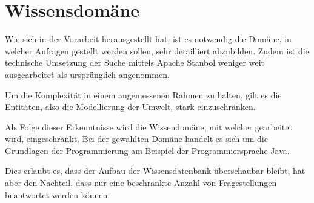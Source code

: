 \chapter{Wissensdomäne}
\label{chap:wissensdomäne}
Wie sich in der Vorarbeit herausgestellt hat, ist es notwendig die Domäne, in welcher Anfragen gestellt werden sollen, sehr detailliert abzubilden. Zudem ist die technische Umsetzung der Suche mittels Apache Stanbol weniger weit ausgearbeitet als ursprünglich angenommen.

Um die Komplexität in einem angemessenen Rahmen zu halten, gilt es die Entitäten, also die Modellierung der Umwelt, stark einzuschränken.


Als Folge dieser Erkenntnisse wird die Wissendomäne, mit welcher gearbeitet wird, eingeschränkt. Bei der gewählten Domäne handelt es sich um die Grundlagen der Programmierung am Beispiel der Programmiersprache Java.

Dies erlaubt es, dass der Aufbau der Wissensdatenbank überschaubar bleibt, hat aber den Nachteil, dass nur eine beschränkte Anzahl von Fragestellungen beantwortet werden können.
